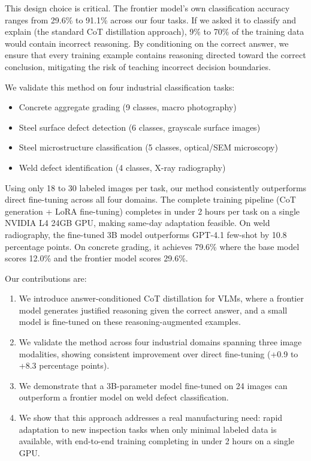 \documentclass{bmvc2k}
\begin{document}
This design choice is critical. The frontier model's own classification accuracy ranges from 29.6\% to 91.1\% across our four tasks. If we asked it to classify and explain (the standard CoT distillation approach), 9\% to 70\% of the training data would contain incorrect reasoning. By conditioning on the correct answer, we ensure that every training example contains reasoning directed toward the correct conclusion, mitigating the risk of teaching incorrect decision boundaries.

We validate this method on four industrial classification tasks:
\begin{itemize}
\item Concrete aggregate grading (9 classes, macro photography)~\cite{coenen2022learning}
\item Steel surface defect detection (6 classes, grayscale surface images)~\cite{song2013noise}
\item Steel microstructure classification (5 classes, optical/SEM microscopy)~\cite{decost2019high}
\item Weld defect identification (4 classes, X-ray radiography)~\cite{totino2022riawelc}
\end{itemize}

Using only 18 to 30 labeled images per task, our method consistently outperforms direct fine-tuning across all four domains. The complete training pipeline (CoT generation + LoRA fine-tuning) completes in under 2 hours per task on a single NVIDIA L4 24GB GPU, making same-day adaptation feasible. On weld radiography, the fine-tuned 3B model outperforms GPT-4.1 few-shot by 10.8 percentage points. On concrete grading, it achieves 79.6\% where the base model scores 12.0\% and the frontier model scores 29.6\%.

Our contributions are:
\begin{enumerate}
\item We introduce answer-conditioned CoT distillation for VLMs, where a frontier model generates justified reasoning given the correct answer, and a small model is fine-tuned on these reasoning-augmented examples.
\item We validate the method across four industrial domains spanning three image modalities, showing consistent improvement over direct fine-tuning (+0.9 to +8.3 percentage points).
\item We demonstrate that a 3B-parameter model fine-tuned on 24 images can outperform a frontier model on weld defect classification.
\item We show that this approach addresses a real manufacturing need: rapid adaptation to new inspection tasks when only minimal labeled data is available, with end-to-end training completing in under 2 hours on a single GPU.
\end{enumerate}
\end{document}
